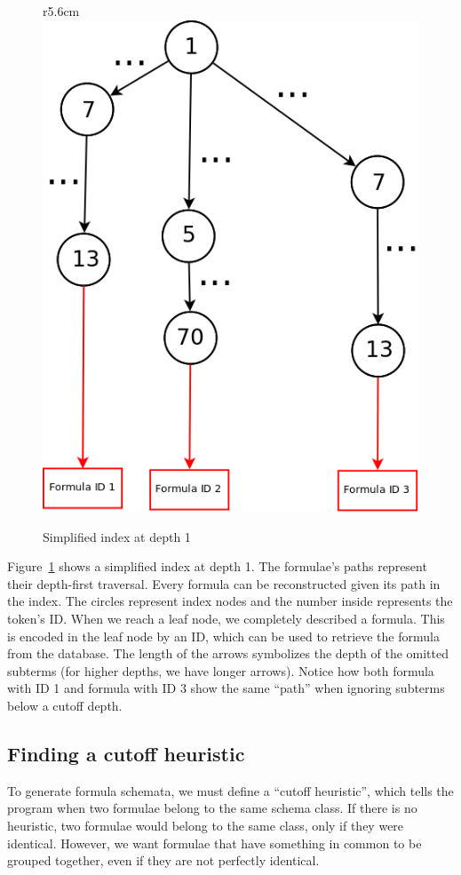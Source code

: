 \begin{figure}r{5.6cm}\vspace*{-1em}
    \includegraphics[scale=0.24]{img/FFG_Algo_diag.png}
\caption{Simplified index at depth 1}\label{fig:algoindex}
\end{figure}

Figure~\ref{fig:algoindex} shows a simplified \MWS index at depth 1.
The formulae's paths represent their depth-first traversal.
Every formula can be reconstructed given its path in the index.
The circles represent index nodes and the number inside represents
the token's ID. When we reach a leaf node, we completely described a
formula. This is encoded in the leaf node by an ID, which can be used
to retrieve the formula from the database.
The length of the arrows symbolizes the depth of the omitted subterms
(for higher depths, we have longer arrows).
Notice how both formula with ID 1 and formula with ID 3 show the same
``path'' when ignoring subterms below a cutoff depth.

\subsection{Finding a cutoff heuristic}\label{subsec:cutoffheur}
To generate formula schemata, we must define a ``cutoff heuristic'',
which tells the program when two formulae belong to the same schema class.
If there is no heuristic, two formulae would belong to the same class,
only if they were identical. However, we want formulae that have something in
common to be grouped together, even if they are not perfectly identical.

